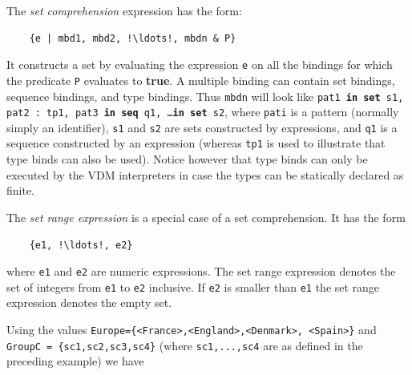 \documentclass{overturerepchap}
\newcommand{\keyw}[1]{{\bf\ttfamily #1}}
\begin{document}
{\begin{description}
  The {\it set comprehension} expression has the form:
  \begin{lstlisting}
    {e | mbd1, mbd2, !\ldots!, mbdn & P}
  \end{lstlisting}
  It constructs a set by evaluating the expression {\tt e} on all the
  bindings for which the predicate {\tt P} evaluates to \keyw{true}. A
  multiple binding can contain set bindings, sequence bindings, and type bindings.
  Thus {\tt mbdn} will look like {\tt pat1 \keyw{in set} s1, pat2 : tp1, pat3 \keyw{in seq} q1,
    \ldots \keyw{in set} s2}, where {\tt pati} is a pattern (normally
  simply an identifier), {\tt s1} and {\tt s2} are sets
  constructed by expressions, and {\tt q1} is a sequence constructed by an expression (whereas {\tt tp1} is used to illustrate
  that type binds can also be used). Notice however that type binds
  can only be executed by the VDM interpreters in case the types can
  be statically declared as finite.

  The {\it set range expression} is a special case of a set
  comprehension. It has the form
  \begin{lstlisting}
    {e1, !\ldots!, e2}
  \end{lstlisting}
  where {\tt e1} and {\tt e2} are numeric expressions. The set range
  expression denotes the set of integers from {\tt e1} to {\tt e2}
  inclusive. If {\tt e2} is smaller than {\tt e1} the set range
  expression denotes the empty set.

\item[Examples:]
  Using  the values \texttt{Europe=\{<France>,<England>,<Denmark>,%
  <Spain>\}} and \texttt{GroupC = \{sc1,sc2,sc3,sc4\}} (where
  \texttt{sc1,...,sc4} are as defined in the preceding example) we have


\end{description}}
\end{document}
